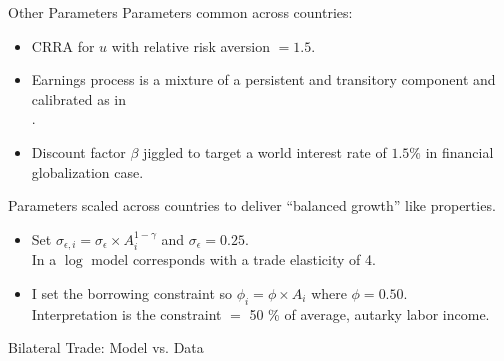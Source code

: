 \documentclass[9pt,pdftex,aspectratio=1610]{beamer}
\theoremstyle{definition}
\begin{document}

\begin{frame}[t]{Other Parameters}
\smallskip
Parameters common across countries:
\begin{itemize}
\smallskip
\item CRRA for $u$ with relative risk aversion $= 1.5$.\\
\smallskip
\item Earnings process is a mixture of a persistent and transitory component and calibrated as in\\ \citet*{krueger2016macroeconomics}. 
\smallskip
\item Discount factor $\beta$ jiggled to target a world interest rate of $1.5 \%$ in financial globalization case. 
\end{itemize}
\bigskip
Parameters scaled across countries to deliver ``balanced growth'' like properties.
\begin{itemize}
\smallskip
\item Set $\sigma_{\epsilon,i} = \sigma_{\epsilon}\times A_i^{1-\gamma}$ and $\sigma_{\epsilon} = 0.25$.\\ In a $\log$ model corresponds with a trade elasticity of 4.
\medskip
\item I set the borrowing constraint so $\phi_{i} = \phi \times A_i$ where $\phi = 0.50$.\\
 Interpretation is the constraint $=$ 50 \% of average, autarky labor income.
\end{itemize}
\end{frame}


\begin{frame}[t]{Bilateral Trade: Model vs. Data}
\begin{figure}[!t]
\end{figure}
\end{frame}
\end{document}

